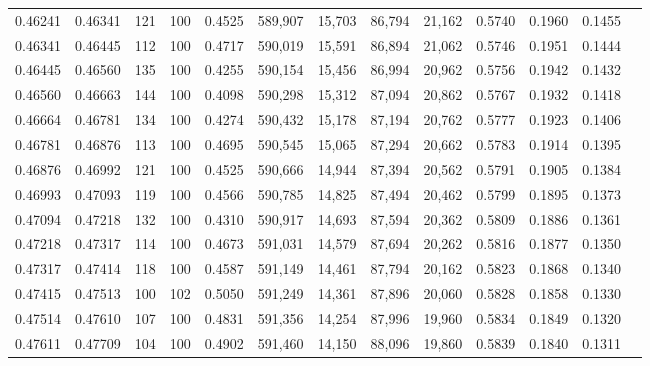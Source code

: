 \begin{tabular}{rrrrrrrrrrrrr}
0.46241 & 0.46341 &   121 & 100 &                                     0.4525 & 589,907 &  15,703 &  86,794 &  21,162 & 0.5740 & 0.1960 & 0.1455 \\
0.46341 & 0.46445 &   112 & 100 &                                     0.4717 & 590,019 &  15,591 &  86,894 &  21,062 & 0.5746 & 0.1951 & 0.1444 \\
0.46445 & 0.46560 &   135 & 100 &                                     0.4255 & 590,154 &  15,456 &  86,994 &  20,962 & 0.5756 & 0.1942 & 0.1432 \\
0.46560 & 0.46663 &   144 & 100 &                                     0.4098 & 590,298 &  15,312 &  87,094 &  20,862 & 0.5767 & 0.1932 & 0.1418 \\
0.46664 & 0.46781 &   134 & 100 &                                     0.4274 & 590,432 &  15,178 &  87,194 &  20,762 & 0.5777 & 0.1923 & 0.1406 \\
0.46781 & 0.46876 &   113 & 100 &                                     0.4695 & 590,545 &  15,065 &  87,294 &  20,662 & 0.5783 & 0.1914 & 0.1395 \\
0.46876 & 0.46992 &   121 & 100 &                                     0.4525 & 590,666 &  14,944 &  87,394 &  20,562 & 0.5791 & 0.1905 & 0.1384 \\
0.46993 & 0.47093 &   119 & 100 &                                     0.4566 & 590,785 &  14,825 &  87,494 &  20,462 & 0.5799 & 0.1895 & 0.1373 \\
0.47094 & 0.47218 &   132 & 100 &                                     0.4310 & 590,917 &  14,693 &  87,594 &  20,362 & 0.5809 & 0.1886 & 0.1361 \\
0.47218 & 0.47317 &   114 & 100 &                                     0.4673 & 591,031 &  14,579 &  87,694 &  20,262 & 0.5816 & 0.1877 & 0.1350 \\
0.47317 & 0.47414 &   118 & 100 &                                     0.4587 & 591,149 &  14,461 &  87,794 &  20,162 & 0.5823 & 0.1868 & 0.1340 \\
0.47415 & 0.47513 &   100 & 102 &                                     0.5050 & 591,249 &  14,361 &  87,896 &  20,060 & 0.5828 & 0.1858 & 0.1330 \\
0.47514 & 0.47610 &   107 & 100 &                                     0.4831 & 591,356 &  14,254 &  87,996 &  19,960 & 0.5834 & 0.1849 & 0.1320 \\
0.47611 & 0.47709 &   104 & 100 &                                     0.4902 & 591,460 &  14,150 &  88,096 &  19,860 & 0.5839 & 0.1840 & 0.1311 \\

\end{tabular}
